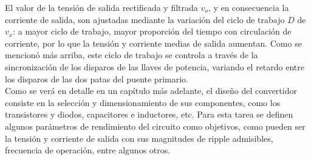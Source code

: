 El valor de la tensión de salida rectificada y filtrada $v_o$, y en consecuencia la corriente de salida, son ajustadas mediante la variación del ciclo de trabajo $D$ de $v_x$: a mayor ciclo de trabajo, mayor proporción del tiempo con circulación de corriente, por lo que la tensión y corriente medias de salida aumentan. Como se mencionó más arriba, este ciclo de trabajo se controla a través de la sincronización de los disparos de las llaves de potencia, variando el retardo entre los disparos de las dos patas del puente primario.\\

Como se verá en detalle en un capítulo más adelante, el diseño del convertidor consiste en la selección y dimensionamiento de sus componentes, como los transistores y diodos, capacitores e inductores, etc. Para esta tarea se definen algunos parámetros de rendimiento del circuito como objetivos, como pueden ser la tensión y corriente de salida con sus magnitudes de ripple admisibles, frecuencia de operación, entre algunos otros.\\
